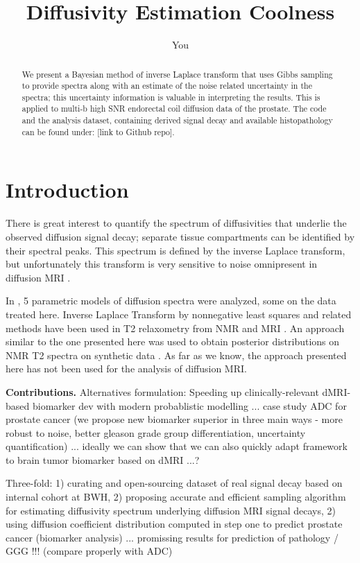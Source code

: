 \documentclass{article}
\title{Diffusivity Estimation Coolness}
\author{You}
\begin{document}
\maketitle

\begin{abstract}
We present a Bayesian method of inverse Laplace transform that uses Gibbs sampling to provide spectra along with an estimate of the noise related uncertainty in the spectra; this uncertainty information is valuable in interpreting the results. This is applied to multi-b high SNR endorectal coil diffusion data of the prostate.
The code and the analysis dataset, containing derived signal decay and available histopathology can be found under: [link to Github repo].
\end{abstract}

\section{Introduction}

There is great interest to quantify the spectrum of diffusivities that underlie the observed diffusion signal decay; separate tissue compartments can be identified by their spectral peaks. This spectrum is defined by the inverse Laplace transform, but unfortunately this transform is very sensitive to noise omnipresent in diffusion MRI \cite{mulkern2017perils}.

In \cite{langkilde2018evaluation}, 5 parametric models of diffusion spectra were analyzed, some on the data treated here. Inverse Laplace Transform by nonnegative least squares and related methods have been used in T2 relaxometry from NMR \cite{WHITTALL1989134} and MRI \cite{ioannidis2020inverse}. An approach similar to the one presented here was used to obtain posterior distributions on NMR T2 spectra on synthetic data \cite{prange2009quantifying}. As far as we know, the approach presented here has not been used for the analysis of diffusion MRI.

\textbf{Contributions.} 
Alternatives formulation: Speeding up clinically-relevant dMRI-based biomarker dev with modern probablistic modelling ... case study ADC for prostate cancer (we propose new biomarker superior in three main ways - more robust to noise, better gleason grade group differentiation, uncertainty quantification) ... ideally we can show that we can also quickly adapt framework to brain tumor biomarker based on dMRI ...?

Three-fold: 1) curating and open-sourcing dataset of real signal decay based on internal cohort at BWH, 2) proposing accurate and efficient sampling algorithm for estimating diffusivity spectrum underlying diffusion MRI signal decays, 2) using diffusion coefficient distribution computed in step one to predict prostate cancer (biomarker analysis) ... promissing results for prediction of pathology / GGG !!! (compare properly with ADC)
\end{document}
